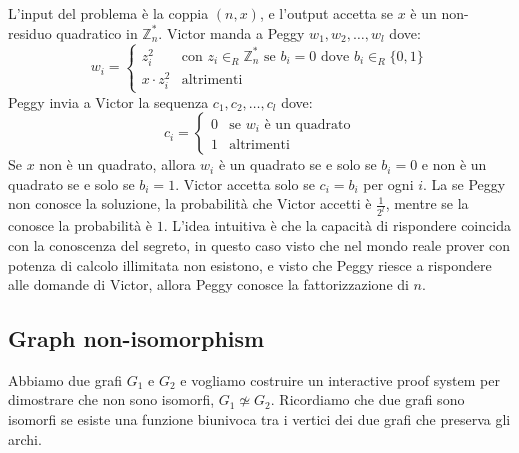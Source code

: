 L'input del problema è la coppia $(n,x)$, e l'output accetta se $x$ è un non-residuo quadratico in $\mathbb{Z}_n^*$.
Victor manda a Peggy $w_1, w_2, \dots, w_l$ dove:
\[
  w_i = \begin{cases}
    z_i^2 & \text{con } z_i \in_R \mathbb{Z}_n^* \text{ se }b_i = 0 \text{ dove }b_i \in_R \{0,1\} \\
    x \cdot z_i^2 & \text{altrimenti}  
    \end{cases}
\]
Peggy invia a Victor la sequenza $c_1, c_2, \dots, c_l$ dove:
\[
  c_i = \begin{cases}
    0 & \text{se }w_i \text{ è un quadrato} \\
    1 & \text{altrimenti}
    \end{cases}
\]
Se $x$ non è un quadrato, allora $w_i$ è un quadrato se e solo se $b_i = 0$ e
non è un quadrato se e solo se $b_i = 1$. Victor accetta solo se $c_i = b_i$ per ogni $i$.
La se Peggy non conosce la soluzione, la probabilità che Victor accetti è $\frac{1}{2^l}$, 
mentre se la conosce la probabilità è $1$.
L'idea intuitiva è che la capacità di rispondere coincida con la conoscenza del segreto, in questo caso 
visto che nel mondo reale prover con potenza di calcolo illimitata non esistono, e visto 
che Peggy riesce a rispondere alle domande di Victor, allora Peggy conosce la fattorizzazione 
di $n$.
\subsection{Graph non-isomorphism}
Abbiamo due grafi $G_1$ e $G_2$ e vogliamo costruire un interactive proof system per dimostrare che non sono isomorfi,
$G_1 \not\simeq  G_2$. Ricordiamo che due grafi sono isomorfi se esiste una funzione biunivoca tra i vertici dei due
grafi che preserva gli archi.

